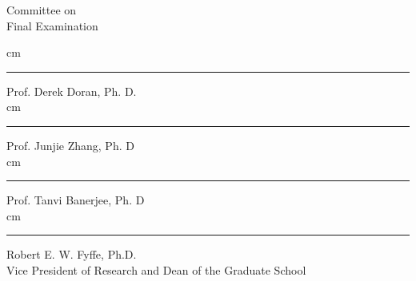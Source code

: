 \begin{minipage}{7cm}
\singlespacing
Committee on 
\\Final Examination\\
\begin{center}
 cm\hrule\par\vskip 2mm
Prof. Derek Doran, Ph. D.\\
 cm\hrule\par\vskip 2mm
Prof. Junjie Zhang, Ph. D\\	%
 cm\hrule\par\vskip 2mm
Prof. Tanvi Banerjee, Ph. D\\		%
 cm\hrule\par\vskip 2mm
Robert E. W. Fyffe, Ph.D.\\
Vice President of Research and Dean of the
Graduate School
\end{center}
\end{minipage}
